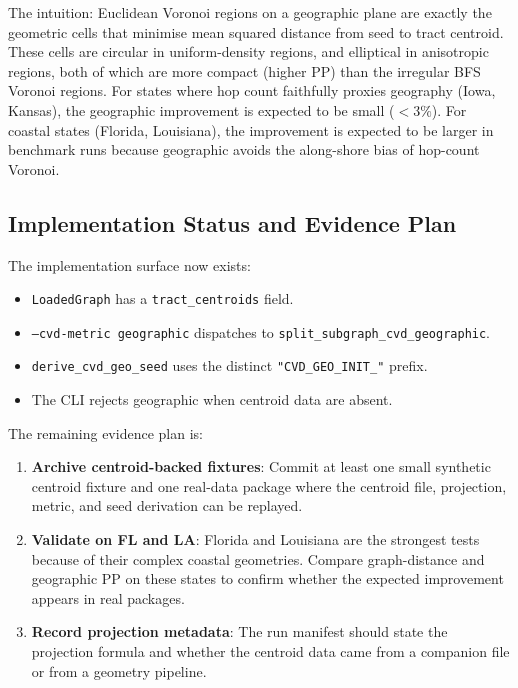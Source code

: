 The intuition: Euclidean Voronoi regions on a geographic plane are exactly
the geometric cells that minimise mean squared distance from seed to tract
centroid. These cells are circular in uniform-density regions, and elliptical
in anisotropic regions, both of which are more compact (higher PP) than the
irregular BFS Voronoi regions.
For states where hop count faithfully proxies geography (Iowa, Kansas),
the geographic improvement is expected to be small ($<3\%$).
For coastal states (Florida, Louisiana), the improvement is expected to be
larger in benchmark runs because geographic \cvd{} avoids the along-shore bias
of hop-count Voronoi.

\subsection{Implementation Status and Evidence Plan}

The implementation surface now exists:

\begin{itemize}
\item \texttt{LoadedGraph} has a \texttt{tract\_centroids} field.
\item \texttt{--cvd-metric geographic} dispatches to
  \texttt{split\_subgraph\_cvd\_geographic}.
\item \texttt{derive\_cvd\_geo\_seed} uses the distinct
  \texttt{"CVD\_GEO\_INIT\_"} prefix.
\item The CLI rejects geographic \cvd{} when centroid data are absent.
\end{itemize}

The remaining evidence plan is:

\begin{enumerate}
\item \textbf{Archive centroid-backed fixtures}:
  Commit at least one small synthetic centroid fixture and one real-data package
  where the centroid file, projection, metric, and seed derivation can be
  replayed.

\item \textbf{Validate on FL and LA}:
  Florida and Louisiana are the strongest tests because of their complex
  coastal geometries.
  Compare graph-distance and geographic \cvd{} PP on these states to confirm
  whether the expected improvement appears in real packages.

\item \textbf{Record projection metadata}:
  The run manifest should state the projection formula and whether the centroid
  data came from a companion file or from a geometry pipeline.
\end{enumerate}

